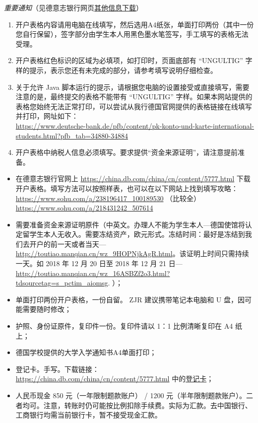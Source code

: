 \documentclass{article}
\begin{document}
\emph{重要通知}（见德意志银行网页\href{https://china.db.com/china/cn/content/5777.html}{其他信息下载}）
\begin{enumerate}
\item 开户表格内容请用电脑在线填写，然后选用A4纸张，单面打印两份（其中一份您自行保留），签字部分由学生本人用黑色墨水笔签写，手工填写的表格无法受理。
\item 开户表格红色标识的区域为必填项，如打印时，页面底部有 ``UNGULTIG'' 字样的提示，表示您还有未完成的部分，请参考填写说明仔细检查。
\item \sloppy 关于允许 Java 脚本运行的提示，请根据您电脑的设置接受或直接填写，需要注意的是，最终提交的表格不能带有 ``UNGULTIG'' 字样。如果本网站提供的表格您始终无法正常打印，可以尝试从我行德国官网提供的表格链接在线填写并打印，网址如下：\\
\url{https://www.deutsche-bank.de/pfb/content/pk-konto-und-karte-international-students.html?pfb_tab=34880-34884}
\item 开户表格中纳税人信息必须填写。要求提供“资金来源证明”，请注意提前准备。
\end{enumerate}
\begin{itemize}
\item 在德意志银行官网上 \url{https://china.db.com/china/cn/content/5777.html} 下载开户表格。填写方法可以按照样表，也可以在以下网站上找到填写攻略：\\
\url{https://www.sohu.com/a/238196417_100189530} （比较全）\\
\url{https://www.sohu.com/a/218431242_507614}
\item 需要准备资金来源证明原件（中英文。办理人不能为学生本人---德国使馆将认定留学生本人无收入。需要冻结资产，欧元形式。冻结时间：最好是冻结到我们去开户的前一天或者当天---\url{http://toutiao.manqian.cn/wz_9HOPNjkAgR.html}。该证明上时间只需持续一天。如 2018 年 12 月 20 日至 2018 年 12 月 21 日---\url{http://toutiao.manqian.cn/wz_16ASBZf2o3.html?tdsourcetag=s_pctim_aiomsg}. ）；
\item 单面打印两份开户表格，一份自留。 ZJR 建议携带笔记本电脑和 U 盘，因可能需要随时修改；
\item 护照、身份证原件，复印件一份。复印件请以 1：1 比例清晰复印在 A4 纸上；
\item 德国学校提供的大学入学通知书A4单面打印；
\item 登记卡。手写。下载链接： \url{https://china.db.com/china/cn/content/5777.html} 中的\href{https://china.db.com/china/docs/Deutsche_Bank-China-Account-Opening-Process-And-Introduction.pdf}{登记卡}；
\item 人民币现金 850 元（一年限制题款账户） / 1200 元（半年限制题款账户）。二者均可。注意，转账时仍可能按比例扣除手续费。实际为汇款。去中国银行、工商银行均需当前银行卡，暂不接受现金汇款。
\end{itemize}
\end{document}
